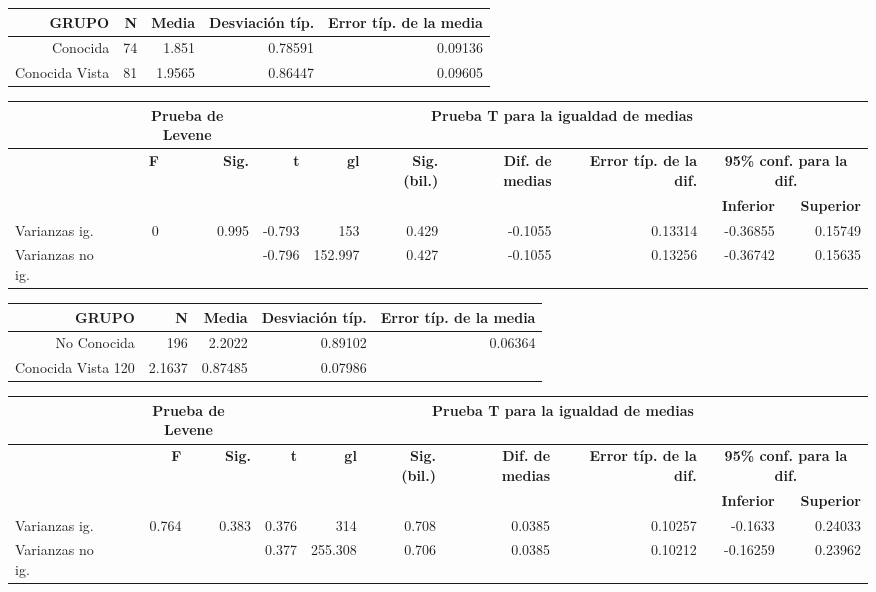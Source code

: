\documentclass[10pt]{beamer}
\begin{document}
\begin{frame}
	\begin{table}
	  \begin{tabular}[t]{|r|r|r|r|r|}
	    \hline
		\textbf{GRUPO} & \textbf{N} & \textbf{Media} & \textbf{Desviación típ.} & \textbf{Error típ. de la media} \\ \hline
		Conocida  & 74 & 1.851 & 0.78591 & 0.09136\\ \hline
		Conocida Vista & 81 & 1.9565 & 0.86447 & 0.09605\\ \hline
	  \end{tabular}
	  \begin{tabular}[t]{|l|r|r|r|r|r|r|r|r|r|}
	    \hline
		  & \multicolumn{2}{|c|}{\textbf{Prueba de Levene}} &  \multicolumn{7}{|c|}{\textbf{Prueba T para la igualdad de medias}} \\ \hline
		  & \textbf{F} & \textbf{Sig.} & \textbf{t} & \textbf{gl} & \textbf{Sig. (bil.)} & \textbf{Dif. de medias} & \textbf{Error típ. de la dif.} & \multicolumn{2}{|c|}{\textbf{95\% conf. para la dif.}} \\ \hline
		  &   &   &   &   &   &   &   & \textbf{Inferior} & \textbf{Superior} \\ \hline
		  Varianzas ig. & 0 & 0.995 & -0.793 & 153 & 0.429 & -0.1055 & 0.13314 & -0.36855 & 0.15749 \\ \hline
		  Varianzas no ig. &   &   & -0.796 & 152.997 & 0.427 & -0.1055 & 0.13256 & -0.36742 & 0.15635 \\ \hline
	  \end{tabular}
	\end{table}

	\begin{table}
	  \begin{tabular}[t]{|r|r|r|r|r|}
	    \hline
		\textbf{GRUPO} & \textbf{N} & \textbf{Media} & \textbf{Desviación típ.} & \textbf{Error típ. de la media} \\ \hline
		No Conocida & 196 & 2.2022 & 0.89102 & 0.06364\\ \hline
		Conocida Vista 120 & 2.1637 & 0.87485 & 0.07986\\ \hline
	  \end{tabular}
	  \begin{tabular}[t]{|l|r|r|r|r|r|r|r|r|r|}
	    \hline
		  & \multicolumn{2}{|c|}{\textbf{Prueba de Levene}} &  \multicolumn{7}{|c|}{\textbf{Prueba T para la igualdad de medias}} \\ \hline
		  & \textbf{F} & \textbf{Sig.} & \textbf{t} & \textbf{gl} & \textbf{Sig. (bil.)} & \textbf{Dif. de medias} & \textbf{Error típ. de la dif.} & \multicolumn{2}{|c|}{\textbf{95\% conf. para la dif.}} \\ \hline
		  &   &   &   &   &   &   &   & \textbf{Inferior} & \textbf{Superior} \\ \hline
		  Varianzas ig. & 0.764 & 0.383 & 0.376 & 314 & 0.708 & 0.0385 & 0.10257 & -0.1633 & 0.24033 \\ \hline
		  Varianzas no ig. &   &   & 0.377 & 255.308 & 0.706 & 0.0385 & 0.10212 & -0.16259 & 0.23962 \\ \hline
	  \end{tabular}
	\end{table}
      \end{frame}
\end{document}
